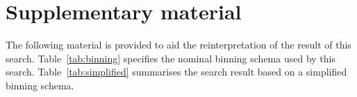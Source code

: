 \clearpage



\appendix


\clearpage
\section*{Supplementary material} 

The following material is provided to aid the reinterpretation of the
result of this search. Table~\ref{tab:binning} specifies the nominal
binning schema used by this search. Table~\ref{tab:simplified}
summarises the search result based on a simplified binning schema.

